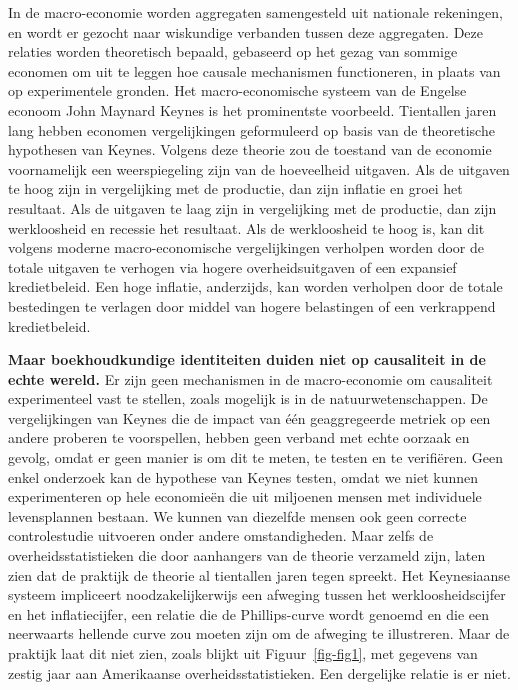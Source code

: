 \documentclass[
  a5paper,
  smalldemyvopaper,11pt,twoside,onecolumn,openright,extrafontsizes,
hidelinks]{memoir}
\begin{document}
In de macro-economie worden aggregaten samengesteld uit nationale
rekeningen, en wordt er gezocht naar wiskundige verbanden tussen deze
aggregaten. Deze relaties worden theoretisch bepaald, gebaseerd op het
gezag van sommige economen om uit te leggen hoe causale mechanismen
functioneren, in plaats van op experimentele gronden. Het
macro-economische systeem van de Engelse econoom John Maynard Keynes is
het prominentste voorbeeld. Tientallen jaren lang hebben economen
vergelijkingen geformuleerd op basis van de theoretische hypothesen van
Keynes. Volgens deze theorie zou de toestand van de economie
voornamelijk een weerspiegeling zijn van de hoeveelheid uitgaven. Als de
uitgaven te hoog zijn in vergelijking met de productie, dan zijn
inflatie en groei het resultaat. Als de uitgaven te laag zijn in
vergelijking met de productie, dan zijn werkloosheid en recessie het
resultaat. Als de werkloosheid te hoog is, kan dit volgens moderne
macro-economische vergelijkingen verholpen worden door de totale
uitgaven te verhogen via hogere overheidsuitgaven of een expansief
kredietbeleid. Een hoge inflatie, anderzijds, kan worden verholpen door
de totale bestedingen te verlagen door middel van hogere belastingen of
een verkrappend kredietbeleid.

\textbf{Maar boekhoudkundige identiteiten duiden niet op causaliteit in
de echte wereld.} Er zijn geen mechanismen in de macro-economie om
causaliteit experimenteel vast te stellen, zoals mogelijk is in de
natuurwetenschappen. De vergelijkingen van Keynes die de impact van één
geaggregeerde metriek op een andere proberen te voorspellen, hebben geen
verband met echte oorzaak en gevolg, omdat er geen manier is om dit te
meten, te testen en te verifiëren. Geen enkel onderzoek kan de hypothese
van Keynes testen, omdat we niet kunnen experimenteren op hele
economieën die uit miljoenen mensen met individuele levensplannen
bestaan. We kunnen van diezelfde mensen ook geen correcte controlestudie
uitvoeren onder andere omstandigheden. Maar zelfs de
overheidsstatistieken die door aanhangers van de theorie verzameld zijn,
laten zien dat de praktijk de theorie al tientallen jaren tegen spreekt.
Het Keynesiaanse systeem impliceert noodzakelijkerwijs een afweging
tussen het werkloosheidscijfer en het inflatiecijfer, een relatie die de
Phillips-curve wordt genoemd en die een neerwaarts hellende curve zou
moeten zijn om de afweging te illustreren. Maar de praktijk laat dit
niet zien, zoals blijkt uit Figuur~\ref{fig-fig1}, met gegevens van
zestig jaar aan Amerikaanse overheidsstatistieken. Een dergelijke
relatie is er niet.
\end{document}
